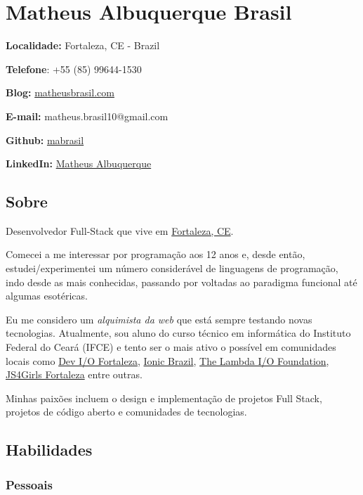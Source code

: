 \documentclass[]{article}
\date{}
\begin{document}
\section{Matheus Albuquerque Brasil}\label{matheus-albuquerque-brasil}

\textbf{Localidade:} Fortaleza, CE - Brazil

\textbf{Telefone}: +55 (85) 99644-1530

\textbf{Blog:} \href{http://matheusbrasil.com}{matheusbrasil.com}

\textbf{E-mail:} matheus.brasil10@gmail.com

\textbf{Github:} \href{https://github.com/mabrasil}{mabrasil}

\textbf{LinkedIn:}
\href{https://www.linkedin.com/in/matheusalbuquerque}{Matheus
Albuquerque}

\subsection{Sobre}\label{sobre}

Desenvolvedor Full-Stack que vive em
\href{http://pt.wikipedia.org/wiki/Fortaleza}{Fortaleza, CE}.

Comecei a me interessar por programação aos 12 anos e, desde então,
estudei/experimentei um número considerável de linguagens de
programação, indo desde as mais conhecidas, passando por voltadas ao
paradigma funcional até algumas esotéricas.

Eu me considero um \emph{alquimista da web} que está sempre testando
novas tecnologias. Atualmente, sou aluno do curso técnico em informática
do Instituto Federal do Ceará (IFCE) e tento ser o mais ativo o possível
em comunidades locais como
\href{https://www.facebook.com/groups/fortalezadevelopers/}{Dev I/O
Fortaleza}, \href{http://ionicbrazil.com/}{Ionic Brazil},
\href{https://github.com/lambda-io}{The Lambda I/O Foundation},
\href{http://js4girls-fortaleza.github.io/}{JS4Girls Fortaleza} entre
outras.

Minhas paixões incluem o design e implementação de projetos Full Stack,
projetos de código aberto e comunidades de tecnologias.

\subsection{Habilidades}\label{habilidades}

\subsubsection{Pessoais}\label{pessoais}
\end{document}
